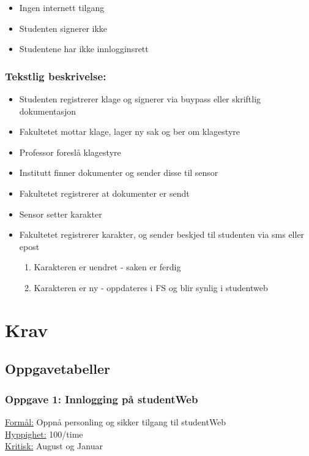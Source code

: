 \documentclass[12pt]{article}
\begin{document}
\begin{itemize}
\item Ingen internett tilgang
\item Studenten signerer ikke
\item Studentene har ikke innlogginsrett
\end{itemize}

\subsubsection*{Tekstlig beskrivelse:}

\begin{itemize}
\item Studenten registrerer klage og signerer via buypass eller skriftlig dokumentasjon
\item Fakultetet mottar klage, lager ny sak og ber om klagestyre
\item Professor foreslå klagestyre
\item Institutt finner dokumenter og sender disse til sensor
\item Fakultetet registrerer at dokumenter er sendt
\item Sensor setter karakter
\item Fakultetet registrerer karakter, og sender beskjed til studenten via sms eller epost
\begin{enumerate}
\item Karakteren er uendret - saken er ferdig
\item Karakteren er ny - oppdateres i FS og blir synlig i studentweb
\end{enumerate}
\end{itemize}


\section{Krav}

\subsection{Oppgavetabeller}

\subsubsection*{Oppgave 1: Innlogging på studentWeb}

\underline{Formål:} Oppnå personling og sikker tilgang til studentWeb\\
\underline{Hyppighet:} 100/time\\
\underline{Kritisk:} August og Januar
\end{document}
